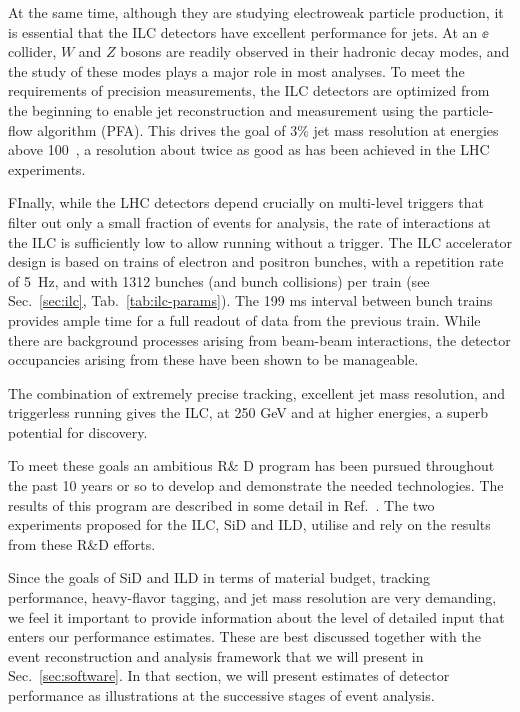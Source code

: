 At the same time, although they are studying electroweak particle
production, it is essential that the ILC detectors have excellent
performance for jets.   At an $\ee$ collider, $W$ and $Z$ bosons are
readily observed in their hadronic decay modes, and the study of these
modes plays a major role in most analyses.    To meet the requirements
of precision measurements, the ILC detectors are optimized from the
beginning to enable jet reconstruction and measurement using 
the particle-flow algorithm (PFA). This drives the goal of $3\%$
 jet mass resolution at energies above 100~\GeV,  a resolution
about twice as good as has been achieved in  the LHC
 experiments.

FInally, while the LHC detectors depend crucially on multi-level
triggers that filter out only a small fraction of events for analysis,
the  rate of interactions at the ILC is sufficiently low to allow
running without a trigger.     The ILC accelerator design is based on
trains of electron and positron bunches, with a repetition rate of
5~Hz, and with 1312 bunches (and bunch
collisions) per train (see Sec.~\ref{sec:ilc},
Tab.~\ref{tab:ilc-params}). 
The 199 ms interval between bunch trains provides ample time for a full
readout of data
 from the  previous train.  While there are background processes arising
 from  beam-beam interactions, the detector occupancies arising from these 
have been shown to be manageable.

The combination of extremely precise tracking, excellent jet mass
resolution, and triggerless running gives the ILC, at 250 GeV and at
higher energies, a superb potential for discovery. 

To meet these goals an ambitious R\& D program has
 been pursued throughout the past 10 years or so to develop and
 demonstrate the needed technologies. The results of this program are
 described in some detail in Ref.~\cite{RDliaision}. 
 The two experiments proposed for
 the ILC, SiD and ILD, utilise and 
rely on the results from these R\&D efforts.

Since the goals of SiD and ILD in terms of material budget, tracking
performance, heavy-flavor tagging, and jet mass resolution are very 
demanding, we feel it important to provide information about the level
of detailed input that enters our performance estimates.   These are
best
discussed together with the event reconstruction and analysis
framework that we will present in Sec.~\ref{sec:software}.   In that
section, we will present estimates of detector performance as
illustrations at the successive stages of event analysis. 



